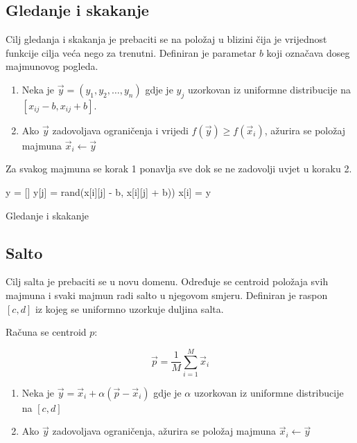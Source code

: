 \subsection{Gledanje i skakanje}
Cilj gledanja i skakanja je prebaciti se na položaj u blizini čija je vrijednost funkcije cilja veća nego za trenutni. Definiran je parametar $b$ koji označava doseg majmunovog pogleda.

\begin{enumerate}
	\item Neka je $\vec{y} = (y_1, y_2, \dots, y_n)$ gdje je
	\subitem $y_j$ uzorkovan iz uniformne distribucije na $[x_{ij} - b, x_{ij} + b]$.
	
	\item Ako $\vec{y}$ zadovoljava ograničenja i vrijedi $f(\vec{y}) \ge f(\vec{x}_i)$, ažurira se položaj majmuna $\vec{x}_i \leftarrow \vec{y}$
\end{enumerate}

Za svakog majmuna se korak 1 ponavlja sve dok se ne zadovolji uvjet u koraku 2.

\begin{algorithm}[H]
	\begin{algorithmic}[1]
		\Repeat
		\State y = []
		\State y[j] = rand(x[i][j] - b, x[i][j] + b))
		\EndFor
		\State x[i] = y
		\EndFor
		\EndFunction
	\end{algorithmic}
	\caption{Gledanje i skakanje}
\end{algorithm}


\subsection{Salto}
Cilj salta je prebaciti se u novu domenu. Određuje se centroid položaja svih majmuna i svaki majmun radi salto u njegovom smjeru. Definiran je raspon $[c, d]$ iz kojeg se uniformno uzorkuje duljina salta.

Računa se centroid $p$:

\begin{equation}
	\vec{p} = \frac{1}{M} \sum_{i = 1}^{M} \vec{x}_i
\end{equation}

\begin{enumerate}
	
	\item Neka je $\vec{y} = \vec{x}_i + \alpha(\vec{p} - \vec{x}_i)$ gdje je
	\subitem $\alpha$ uzorkovan iz uniformne distribucije na $[c, d]$
	
	\item Ako $\vec{y}$ zadovoljava ograničenja, ažurira se položaj majmuna $\vec{x}_i \leftarrow \vec{y}$
\end{enumerate}

